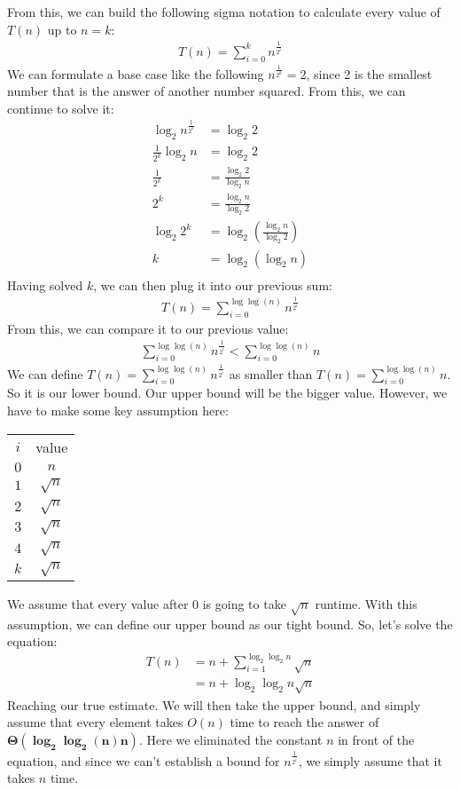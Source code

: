 \documentclass[
	12pt
]{fphw}
\begin{document}
\begin{enumerate}
	From this, we can build the following sigma notation to calculate every value of $T(n)$ up to $n = k$:
	\begin{align*}
		T(n) = \sum_{i=0}^{k} n^{\frac{1}{2^i}}
	\end{align*}
	We can formulate a base case like the following $n^{\frac{1}{2^k}} = 2$, since 2 is the smallest number that is the answer of another number squared. From this, we can continue to solve it:
	\begin{align*}
		\log_2 n^{\frac{1}{2^k}} &= \log_2 2\\
		\frac{1}{2^k} \log_2 n &= \log_2 2\\
		\frac{1}{2^k} &= \frac{\log_2 2}{\log_2 n}\\
		2^k &= \frac{\log_2 n}{\log_2 2}\\
		\log_2 2^k &= \log_2(\frac{\log_2 n}{\log_2 2})\\
		k &= \log_2(\log_2 n)\\
	\end{align*}
	Having solved $k$, we can then plug it into our previous sum:
	\begin{align*}
		T(n) = \sum_{i = 0}^{\log \log(n)} n^{\frac{1}{2^i}}
	\end{align*}
	From this, we can compare it to our previous value:
	\begin{align*}
		\sum_{i = 0}^{\log \log(n)} n^{\frac{1}{2^i}} < \sum_{i = 0}^{\log \log(n)} n
	\end{align*}
	We can define $T(n) = \sum_{i = 0}^{\log \log(n)} n^{\frac{1}{2^i}}$ as smaller than $T(n) = \sum_{i = 0}^{\log \log(n)} n$. So it is our lower bound. Our upper bound will be the bigger value. However, we have to make some key assumption here:
	\begin{center}
		\begin{tabular}{c | c}
			$i$ & value \\
			$0$ & $n$ \\
			$1$ & $\sqrt{n}$ \\
			$2$ & $\sqrt{n}$ \\
			$3$ & $\sqrt{n}$ \\
			$4$ & $\sqrt{n}$ \\
			$k$ & $\sqrt{n}$ \\
		\end{tabular}
	\end{center}
	We assume that every value after $0$ is going to take $\sqrt{n}$ runtime. With this assumption, we can define our upper bound as our tight bound. So, let's solve the equation:
	\begin{align*}
		T(n) &= n + \sum_{i = 1}^{\log_2 \log_2 n} \sqrt{n}\\
		&= n + \log_2 \log_2 n \sqrt{n}
	\end{align*}
	Reaching our true estimate. We will then take the upper bound, and simply assume that every element takes $O(n)$ time to reach the answer of $\boxed{\mathbf{\Theta(\log_2 \log_2 (n) n)}}$. Here we eliminated the constant $n$ in front of the equation, and since we can't establish a bound for $n^{\frac{1}{2^i}}$, we simply assume that it takes $n$ time.
\end{enumerate}
\end{document}
